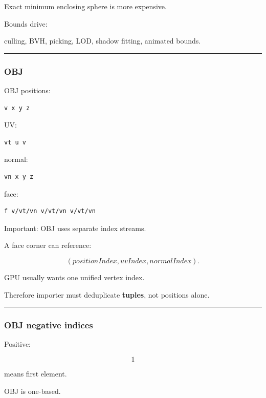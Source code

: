 Exact minimum enclosing sphere is more expensive.

Bounds drive:

culling, BVH, picking, LOD, shadow fitting, animated bounds.

\begin{center}\rule{0.5\linewidth}{0.5pt}\end{center}

\subsubsection{OBJ}\label{obj}

OBJ positions:

\begin{verbatim}
v x y z
\end{verbatim}

UV:

\begin{verbatim}
vt u v
\end{verbatim}

normal:

\begin{verbatim}
vn x y z
\end{verbatim}

face:

\begin{verbatim}
f v/vt/vn v/vt/vn v/vt/vn
\end{verbatim}

Important: OBJ uses separate index streams.

A face corner can reference:

\[
(positionIndex,
uvIndex,
normalIndex).
\]

GPU usually wants one unified vertex index.

Therefore importer must deduplicate \textbf{tuples}, not positions alone.

\begin{center}\rule{0.5\linewidth}{0.5pt}\end{center}

\subsubsection{OBJ negative indices}\label{obj-negative-indices}

Positive:

\[
1
\]

means first element.

OBJ is one-based.

